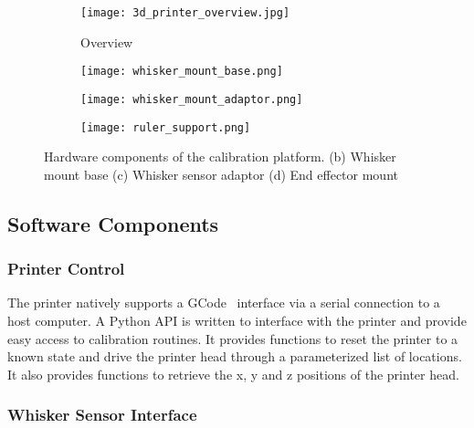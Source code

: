 \documentclass[runningheads]{llncs}
\begin{document}
\begin{figure}
    \begin{subfigure}{.245\columnwidth}
        \centering
        \texttt{[image: 3d\_printer\_overview.jpg]}
        \caption{Overview}
        \label{fig:calibration_rig_overview}
    \end{subfigure}
    \begin{subfigure}{.245\columnwidth}
    \centering
    \texttt{[image: whisker\_mount\_base.png]}
        \caption{}
        \label{fig:whisker_mount_base}
    \end{subfigure}
    \begin{subfigure}{.245\columnwidth}
        \centering
        \texttt{[image: whisker\_mount\_adaptor.png]}
        \caption{}
        \label{fig:whisker_mount_adaptor}
    \end{subfigure}
    \begin{subfigure}{.245\columnwidth}
        \centering
        \texttt{[image: ruler\_support.png]}
        \caption{}
        \label{fig:beam_monunt}
    \end{subfigure}
    \caption{Hardware components of the calibration platform. (b) Whisker mount base (c) Whisker sensor adaptor (d) End effector mount}
    \label{fig:calibration_rig}
\end{figure}

\subsection{Software Components}

\subsubsection{Printer Control}

The printer natively supports a GCode~\cite{kramerNISTRS274NGCInterpreter2000} interface via a serial connection to a host computer. A Python API is written to interface with the printer and provide easy access to calibration routines. It provides functions to reset the printer to a known state and drive the printer head through a parameterized list of locations. It also provides functions to retrieve the x, y and z positions of the printer head.

\subsubsection{Whisker Sensor Interface}
\end{document}

